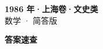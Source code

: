 \documentclass[zihao=-4, a4paper]{ctexart}
\begin{document}
\begin{center}
  {\Large\bfseries 1986 年·上海卷·文史类}\\[4pt]
  {\large 数学 · 简答版}
\end{center}
\medskip
{}

\clearpage
{}
\begin{center}{\Large\bfseries 答案速查}\end{center}
\medskip

\end{document}
